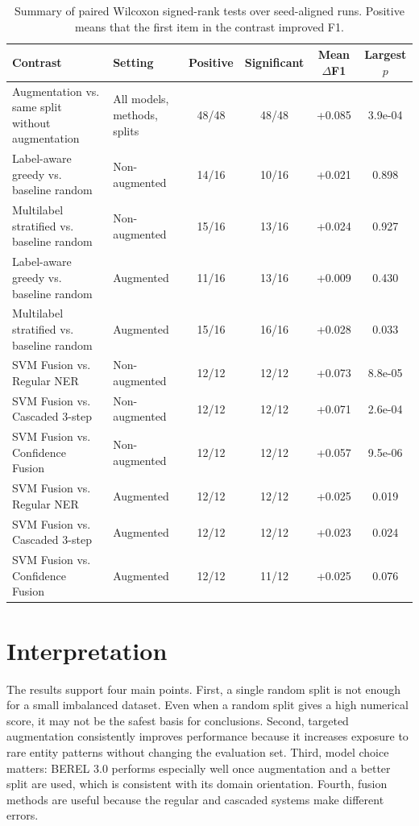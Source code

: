 \documentclass[12pt,a4paper]{report}
\begin{document}
\begin{table}[htbp]
\centering
\scriptsize
\caption{Summary of paired Wilcoxon signed-rank tests over seed-aligned runs. Positive means that the first item in the contrast improved F1.}
\label{tab:wilcoxon_summary}
\begin{tabular}{p{4.7cm}p{2.3cm}cccc}
\toprule
Contrast & Setting & Positive & Significant & Mean $\Delta$F1 & Largest $p$ \\
\midrule
Augmentation vs. same split without augmentation & All models, methods, splits & 48/48 & 48/48 & +0.085 & 3.9e-04 \\
Label-aware greedy vs. baseline random & Non-augmented & 14/16 & 10/16 & +0.021 & 0.898 \\
Multilabel stratified vs. baseline random & Non-augmented & 15/16 & 13/16 & +0.024 & 0.927 \\
Label-aware greedy vs. baseline random & Augmented & 11/16 & 13/16 & +0.009 & 0.430 \\
Multilabel stratified vs. baseline random & Augmented & 15/16 & 16/16 & +0.028 & 0.033 \\
SVM Fusion vs. Regular NER & Non-augmented & 12/12 & 12/12 & +0.073 & 8.8e-05 \\
SVM Fusion vs. Cascaded 3-step & Non-augmented & 12/12 & 12/12 & +0.071 & 2.6e-04 \\
SVM Fusion vs. Confidence Fusion & Non-augmented & 12/12 & 12/12 & +0.057 & 9.5e-06 \\
SVM Fusion vs. Regular NER & Augmented & 12/12 & 12/12 & +0.025 & 0.019 \\
SVM Fusion vs. Cascaded 3-step & Augmented & 12/12 & 12/12 & +0.023 & 0.024 \\
SVM Fusion vs. Confidence Fusion & Augmented & 12/12 & 11/12 & +0.025 & 0.076 \\
\bottomrule
\end{tabular}
\end{table}

\section{Interpretation}
The results support four main points. First, a single random split is not enough for a small imbalanced dataset. Even when a random split gives a high numerical score, it may not be the safest basis for conclusions. Second, targeted augmentation consistently improves performance because it increases exposure to rare entity patterns without changing the evaluation set. Third, model choice matters: BEREL 3.0 performs especially well once augmentation and a better split are used, which is consistent with its domain orientation. Fourth, fusion methods are useful because the regular and cascaded systems make different errors.
\end{document}
